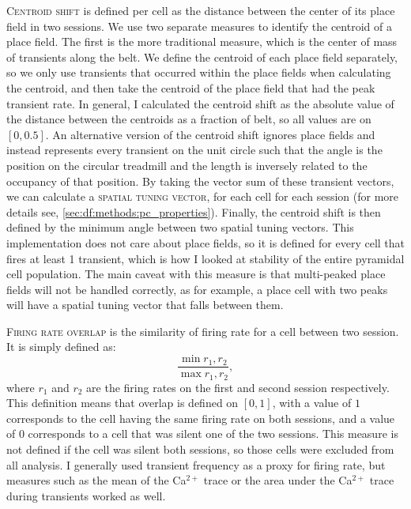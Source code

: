 \textsc{Centroid shift} is defined per cell as the distance between the center of its place field in two sessions.
We use two separate measures to identify the centroid of a place field.
The first is the more traditional measure, which is the center of mass of transients along the belt.
We define the centroid of each place field separately, so we only use transients that occurred within the place fields when calculating the centroid, and then take the centroid of the place field that had the peak transient rate.
In general, I calculated the centroid shift as the absolute value of the distance between the centroids as a fraction of belt, so all values are on $[0, 0.5]$.
An alternative version of the centroid shift ignores place fields and instead represents every transient on the unit circle such that the angle is the position on the circular treadmill and the length is inversely related to the occupancy of that position.
By taking the vector sum of these transient vectors, we can calculate a \textsc{spatial tuning vector}, for each cell for each session (for more details see, \autoref{sec:df:methods:pc_properties}).
Finally, the centroid shift is then defined by the minimum angle between two spatial tuning vectors.
This implementation does not care about place fields, so it is defined for every cell that fires at least 1 transient, which is how I looked at stability of the entire pyramidal cell population.
The main caveat with this measure is that multi-peaked place fields will not be handled correctly, as for example, a place cell with two peaks will have a spatial tuning vector that falls between them.

\textsc{Firing rate overlap} is the similarity of firing rate for a cell between two session. It is simply defined as:
$$\frac{\min{r_1, r_2}}{\max{r_1, r_2}},$$
where $r_1$ and $r_2$ are the firing rates on the first and second session respectively.
This definition means that overlap is defined on $[0, 1]$, with a value of $1$ corresponds to the cell having the same firing rate on both sessions, and a value of $0$ corresponds to a cell that was silent one of the two sessions.
This measure is not defined if the cell was silent both sessions, so those cells were excluded from all analysis.
I generally used transient frequency as a proxy for firing rate, but measures such as the mean of the Ca$^{2+}$ trace or the area under the Ca$^{2+}$ trace during transients worked as well.
